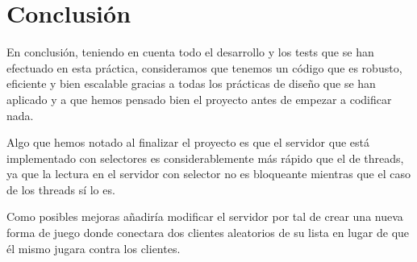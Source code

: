 \newpage
\section{Conclusión}
En conclusión, teniendo en cuenta todo el desarrollo y los tests que se han efectuado en esta práctica, consideramos que tenemos un código que es robusto, eficiente y bien escalable gracias a todas los prácticas de diseño que se han aplicado y a que hemos pensado bien el proyecto antes de empezar a codificar nada.

Algo que hemos notado al finalizar el proyecto es que el servidor que está implementado con selectores es considerablemente más rápido que el de threads, ya que la lectura en el servidor con selector no es bloqueante mientras que el caso de los threads sí lo es.

Como posibles mejoras añadiría modificar el servidor por tal de crear una nueva forma de juego donde conectara dos clientes aleatorios de su lista en lugar de que él mismo jugara contra los clientes.

\newpage

